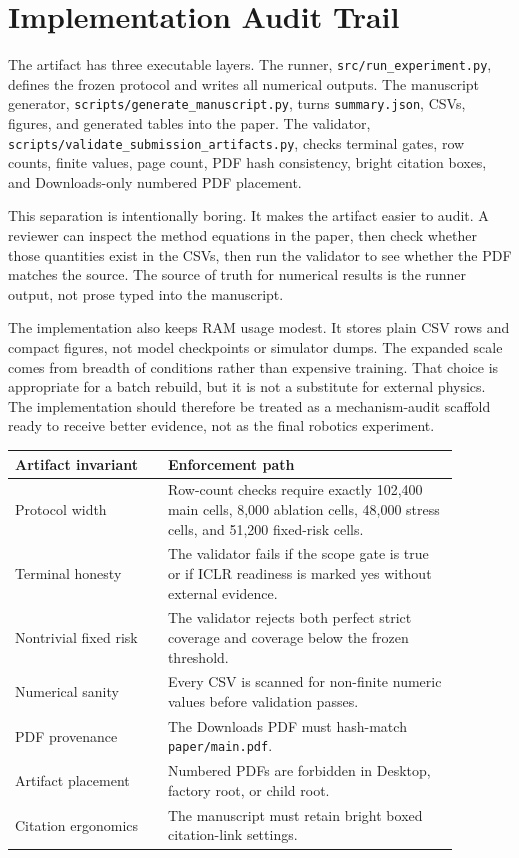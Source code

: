\documentclass{article}
\begin{document}
\clearpage
\section{Implementation Audit Trail}
The artifact has three executable layers. The runner, \texttt{src/run\_experiment.py}, defines the frozen protocol and writes all numerical outputs. The manuscript generator, \texttt{scripts/generate\_manuscript.py}, turns \texttt{summary.json}, CSVs, figures, and generated tables into the paper. The validator, \texttt{scripts/validate\_submission\_artifacts.py}, checks terminal gates, row counts, finite values, page count, PDF hash consistency, bright citation boxes, and Downloads-only numbered PDF placement.

This separation is intentionally boring. It makes the artifact easier to audit. A reviewer can inspect the method equations in the paper, then check whether those quantities exist in the CSVs, then run the validator to see whether the PDF matches the source. The source of truth for numerical results is the runner output, not prose typed into the manuscript.

The implementation also keeps RAM usage modest. It stores plain CSV rows and compact figures, not model checkpoints or simulator dumps. The expanded scale comes from breadth of conditions rather than expensive training. That choice is appropriate for a batch rebuild, but it is not a substitute for external physics. The implementation should therefore be treated as a mechanism-audit scaffold ready to receive better evidence, not as the final robotics experiment.

\begin{longtable}{p{0.30\linewidth}p{0.58\linewidth}}
\toprule
Artifact invariant & Enforcement path \\
\midrule
Protocol width & Row-count checks require exactly 102,400 main cells, 8,000 ablation cells, 48,000 stress cells, and 51,200 fixed-risk cells. \\
Terminal honesty & The validator fails if the scope gate is true or if ICLR readiness is marked yes without external evidence. \\
Nontrivial fixed risk & The validator rejects both perfect strict coverage and coverage below the frozen threshold. \\
Numerical sanity & Every CSV is scanned for non-finite numeric values before validation passes. \\
PDF provenance & The Downloads PDF must hash-match \texttt{paper/main.pdf}. \\
Artifact placement & Numbered PDFs are forbidden in Desktop, factory root, or child root. \\
Citation ergonomics & The manuscript must retain bright boxed citation-link settings. \\
\bottomrule
\end{longtable}
\end{document}

